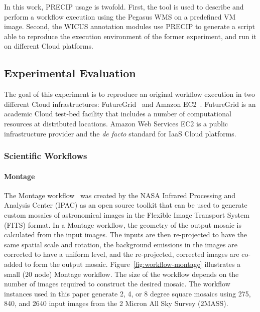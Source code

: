 \documentclass[final,5p,times,twocolumn]{elsarticle}
\begin{document}
In this work, PRECIP usage is twofold. First, the tool is used to describe and perform a workflow execution using the Pegasus WMS on a predefined VM image. Second, the WICUS annotation modules use PRECIP to generate a script able to reproduce the execution environment of the former experiment, and run it on different Cloud platforms.



\subsection{Experimental Evaluation}

The goal of this experiment is to reproduce an original workflow execution in two different Cloud infrastructures: FutureGrid~\cite{futuregrid} and Amazon EC2~\cite{aws}. FutureGrid is an academic Cloud test-bed facility that includes a number of computational resources at distributed locations. Amazon Web Services EC2 is a public infrastructure provider and the \emph{de facto} standard for IaaS Cloud platforms.


\subsubsection{Scientific Workflows}

\paragraph{\textbf{Montage}}
The Montage workflow~\cite{Montage} was created by the NASA Infrared Processing and Analysis
Center (IPAC) as an open source toolkit that can be used to generate custom mosaics of
astronomical images in the Flexible Image Transport System (FITS) format. In a Montage workflow,
the geometry of the output mosaic is calculated from the 
input images. The inputs are then re-projected to have the same spatial scale and rotation, 
the background emissions in the images are corrected to have a uniform level, and the 
re-projected, corrected images are co-added to form the output mosaic.
Figure~\ref{fig:workflow-montage} illustrates a small (20 node) Montage workflow. 
The size of the workflow depends on the number of images required to construct the 
desired mosaic. The workflow instances used in this paper generate 2, 4, or 8 degree square
mosaics using 275, 840, and 2640 input images from the 2 Micron All Sky Survey (2MASS).
\end{document}
